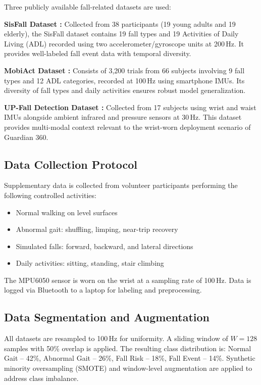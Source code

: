 \documentclass[conference]{IEEEtran}
\begin{document}
Three publicly available fall-related datasets are used:

\textbf{SisFall Dataset \cite{sisfall}:} Collected from 38 participants (19 young adults and 19 elderly), the SisFall dataset contains 19 fall types and 19 Activities of Daily Living (ADL) recorded using two accelerometer/gyroscope units at 200\,Hz. It provides well-labeled fall event data with temporal diversity.

\textbf{MobiAct Dataset \cite{mobiact}:} Consists of 3,200 trials from 66 subjects involving 9 fall types and 12 ADL categories, recorded at 100\,Hz using smartphone IMUs. Its diversity of fall types and daily activities ensures robust model generalization.

\textbf{UP-Fall Detection Dataset \cite{upfall}:} Collected from 17 subjects using wrist and waist IMUs alongside ambient infrared and pressure sensors at 30\,Hz. This dataset provides multi-modal context relevant to the wrist-worn deployment scenario of Guardian 360.

\subsection{Data Collection Protocol}

Supplementary data is collected from volunteer participants performing the following controlled activities:
\begin{itemize}
  \item Normal walking on level surfaces
  \item Abnormal gait: shuffling, limping, near-trip recovery
  \item Simulated falls: forward, backward, and lateral directions
  \item Daily activities: sitting, standing, stair climbing
\end{itemize}

The MPU6050 sensor is worn on the wrist at a sampling rate of 100\,Hz. Data is logged via Bluetooth to a laptop for labeling and preprocessing.

\subsection{Data Segmentation and Augmentation}

All datasets are resampled to 100\,Hz for uniformity. A sliding window of $W=128$ samples with 50\% overlap is applied. The resulting class distribution is: Normal Gait -- 42\%, Abnormal Gait -- 26\%, Fall Risk -- 18\%, Fall Event -- 14\%. Synthetic minority oversampling (SMOTE) and window-level augmentation are applied to address class imbalance.
\end{document}
